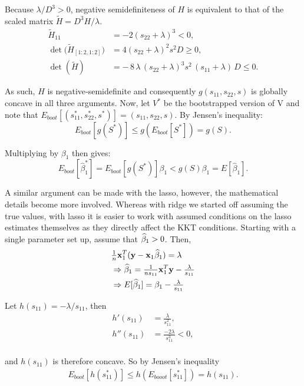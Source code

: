 \noindent Because $\lambda/D^{3}>0$, negative semidefiniteness of $H$ is equivalent to that of the scaled matrix $\tilde H = D^{3}H/\lambda$.
$$
\begin{aligned}
\tilde H_{11} &= -2(s_{22}+\lambda)^{3} < 0, \\
\det\bigl(\tilde H_{[1:2,1:2]}\bigr) &= 4(s_{22}+\lambda)^{2}s^{2}D \geq 0, \\
\det(\tilde H) &= -\,8\,\lambda\,(s_{22}+\lambda)^{3}s^{2}\,(s_{11}+\lambda)\,D \leq 0.
\end{aligned}
$$

\noindent As such, $H$ is negative‐semidefinite and consequently $g(s_{11},s_{22},s)$ is globally concave in all three arguments. Now, let $V^*$ be the bootstrapped version of V and note that $E_{boot}[(s_{11}^*, s_{22}^*, s^*)] = (s_{11}, s_{22}, s)$. By Jensen's inequality:
$$
E_{boot}[g(S^*)] \leq g(E_{boot}[S^*]) = g(S).
$$

\noindent Multiplying by $\beta_1$ then gives:
$$
E_{boot}[\hat{\beta}_1^*] = E_{boot}[g(S^*)]\beta_1 < g(S)\beta_1 = E[\hat{\beta}_1].
$$

A similar argument can be made with the lasso, however, the mathematical details become more involved. Whereas with ridge we started off assuming the true values, with lasso it is easier to work with assumed conditions on the lasso estimates themselves as they directly affect the KKT conditions. Starting with a single parameter set up, assume that $\widehat{\beta}_1 > 0$. Then,
$$
\begin{aligned}
&\tfrac{1}{n}\mathbf{x}_1^T(\mathbf{y} - \mathbf{x}_1 \widehat{\beta}_1) = \lambda \\
&\Rightarrow \widehat{\beta}_1 = \tfrac{1}{ns_{11}}\mathbf{x}_1^T\mathbf{y} - \tfrac{\lambda}{s_{11}} \\
&\Rightarrow E[\widehat{\beta}_1] = \beta_1 - \tfrac{\lambda}{s_{11}} \\
\end{aligned}
$$

\noindent Let $h(s_{11}) = -\lambda / s_{11}$, then
$$
\begin{aligned}
h'(s_{11}) &= \tfrac{\lambda}{s_{11}^2}, \\
h''(s_{11}) &= \tfrac{-2\lambda}{s_{11}^3}  < 0,\\
\end{aligned}
$$

\noindent and $h(s_{11})$ is therefore concave. So by Jensen's inequality
$$
\begin{aligned}
E_{boot}[h(s_{11}^*)] \leq h(E_{booot}[s_{11}^*]) = h(s_{11}).
\end{aligned}
$$

